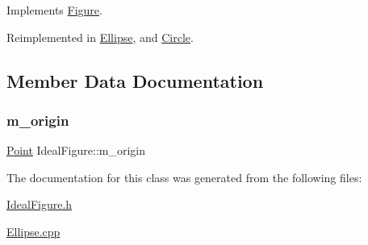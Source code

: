 Implements \hyperlink{class_figure_a11994f67ee209a46047e0897680f6313}{Figure}.



Reimplemented in \hyperlink{class_ellipse_ab6c64b8c54cb74a4552a5f4f487f8d7d}{Ellipse}, and \hyperlink{class_circle_a86fa86f49342a310db5e717c75011487}{Circle}.



\subsection{Member Data Documentation}
\mbox{\label{class_ideal_figure_a1d3d83b08736c67e93cf685ba5228814}} 
\subsubsection{\texorpdfstring{m\+\_\+origin}{m\_origin}}
{\footnotesize\ttfamily \hyperlink{class_point}{Point} Ideal\+Figure\+::m\+\_\+origin\hspace{0.3cm}{\ttfamily [protected]}}



The documentation for this class was generated from the following files\+:\begin{DoxyCompactItemize}
\item 
\hyperlink{_ideal_figure_8h}{Ideal\+Figure.\+h}\item 
\hyperlink{_ellipse_8cpp}{Ellipse.\+cpp}\end{DoxyCompactItemize}
